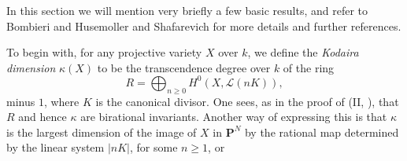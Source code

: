 {In this section we will mention very briefly a few basic results, and refer to Bombieri and Husemoller  and Shafarevich  for more details and further references.

\medskip
To begin with, for any projective variety $X$ over $k$, we define the \emph{Kodaira dimension} $\kappa(X)$ to be the transcendence degree over $k$ of the ring
\[
R=\bigoplus_{n\ge0}H^0(X,\mathcal L(nK)),
\]
minus $1$, where $K$ is the canonical divisor. One sees, as in the proof of (II, ), that $R$ and hence $\kappa$ are birational invariants. Another way of expressing this is that $\kappa$ is the largest dimension of the image of $X$ in $\mathbf P^N$ by the rational map determined by the linear system $|nK|$, for some $n\ge1$, or}
